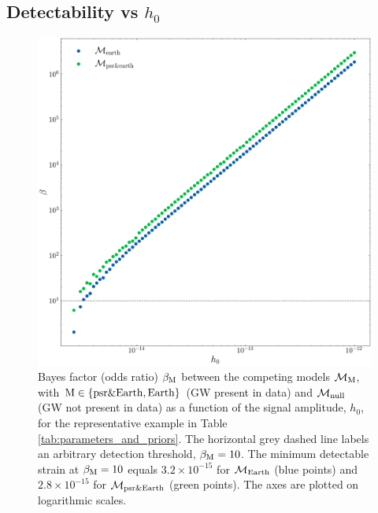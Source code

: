 \documentclass[fleqn,usenatbib,useAMS]{mnras}
\begin{document}
\subsection{Detectability vs $h_0$}\label{sec:psr_v_earth_bayes}
		\begin{figure}
			\includegraphics[width=\columnwidth, height = \columnwidth ]{images/CanonicalBayesPlot2000} 	
			\caption{Bayes factor (odds ratio) $\beta_{\rm M}$ between the competing models $\mathcal{M}_{\rm M}$, with $\rm M \in \left \{ \rm psr \& Earth, Earth \right \}$ (GW present in data) and $\mathcal{M}_{\rm null}$ (GW not present in data) as a function of the signal amplitude, $h_0$, for the representative example in Table \ref{tab:parameters_and_priors}. The horizontal grey dashed line labels an arbitrary detection threshold, $\beta_{\rm M} = 10$. The minimum detectable strain at $\beta_{\rm M} = 10$ equals $3.2 \times 10^{-15}$ for $\mathcal{M}_{\rm Earth}$ (blue points) and $2.8 \times 10^{-15}$ for $\mathcal{M}_{\rm psr \& Earth}$ (green points). The axes are plotted on logarithmic scales.}
			\label{fig:bayes1}
		\end{figure}
	
\end{document}
